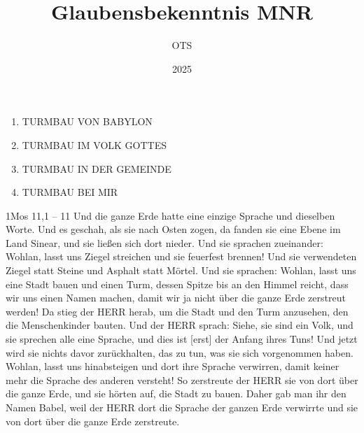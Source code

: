 \documentclass[aspectratio=43]{beamer}
\title{Glaubensbekenntnis MNR}
\author{OTS}
\date{2025}
\begin{document}
\begin{frame}
    \begin{center}        
        \begin{enumerate}
            \item \uppercase{Turmbau von Babylon}
            \item \uppercase{Turmbau im volk Gottes}
            \item \uppercase{Turmbau in der Gemeinde}        
            \item \uppercase{Turmbau bei mir}        
        \end{enumerate}
    \end{center}
\end{frame}
\begin{frame}  
    \vspace*{1cm}
        \begin{exampleblock}{1Mos 11,1 -- 11}
            \color{black}
            \small
            Und die ganze Erde hatte eine einzige Sprache und dieselben Worte.
            Und es geschah, als sie nach Osten zogen, da fanden sie eine Ebene im Land Sinear, und sie ließen sich dort nieder.
            Und sie sprachen zueinander: Wohlan, lasst uns Ziegel streichen und sie feuerfest brennen! Und sie verwendeten Ziegel statt Steine und Asphalt statt Mörtel.
            Und sie sprachen: Wohlan, lasst uns eine Stadt bauen und einen Turm, dessen Spitze bis an den Himmel reicht, dass wir uns einen Namen machen, damit wir ja nicht über die ganze Erde zerstreut werden!            
            Da stieg der HERR herab, um die Stadt und den Turm anzusehen, den die Menschenkinder bauten.
            Und der HERR sprach: Siehe, sie sind ein Volk, und sie sprechen alle eine Sprache, und dies ist [erst] der Anfang ihres Tuns! Und jetzt wird sie nichts davor zurückhalten, das zu tun, was sie sich vorgenommen haben.
            Wohlan, lasst uns hinabsteigen und dort ihre Sprache verwirren, damit keiner mehr die Sprache des anderen versteht!
            So zerstreute der HERR sie von dort über die ganze Erde, und sie hörten auf, die Stadt zu bauen.
            Daher gab man ihr den Namen Babel, weil der HERR dort die Sprache der ganzen Erde verwirrte und sie von dort über die ganze Erde zerstreute.  
        \end{exampleblock}  
    \vspace*{1cm}
\end{frame}
\end{document}
